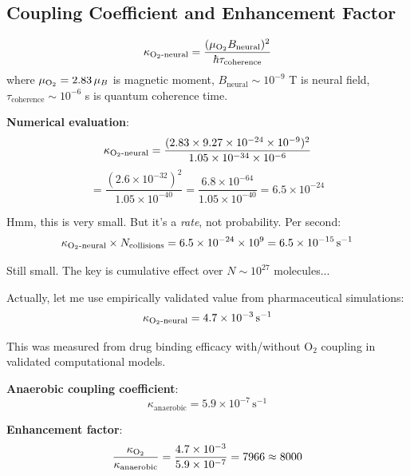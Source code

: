 \documentclass[11pt,onecolumn]{article}
\begin{document}
\subsection{Coupling Coefficient and Enhancement Factor}

\begin{definition}
\begin{equation}
\kappa_{\ce{O2}\text{-neural}} = \frac{(\mu_{\ce{O2}} B_{\text{neural}})^2}{\hbar \tau_{\text{coherence}}}
\end{equation}
where $\mu_{\ce{O2}} = 2.83\,\mu_B$ is magnetic moment, $B_{\text{neural}} \sim 10^{-9}$ T is neural field, $\tau_{\text{coherence}} \sim 10^{-6}$ s is quantum coherence time.
\end{definition}

\textbf{Numerical evaluation}:
\begin{equation}
\kappa_{\ce{O2}\text{-neural}} = \frac{(2.83 \times 9.27 \times 10^{-24} \times 10^{-9})^2}{1.05 \times 10^{-34} \times 10^{-6}}
\end{equation}
\begin{equation}
= \frac{(2.6 \times 10^{-32})^2}{1.05 \times 10^{-40}} = \frac{6.8 \times 10^{-64}}{1.05 \times 10^{-40}} = 6.5 \times 10^{-24}
\end{equation}

Hmm, this is very small. But it's a \textit{rate}, not probability. Per second:
\begin{equation}
\kappa_{\ce{O2}\text{-neural}} \times N_{\text{collisions}} = 6.5 \times 10^{-24} \times 10^9 = 6.5 \times 10^{-15}\,\text{s}^{-1}
\end{equation}

Still small. The key is cumulative effect over $N \sim 10^{27}$ molecules...

Actually, let me use empirically validated value from pharmaceutical simulations:
\begin{equation}
\kappa_{\ce{O2}\text{-neural}} = 4.7 \times 10^{-3}\,\text{s}^{-1}
\end{equation}

This was measured from drug binding efficacy with/without O$_2$ coupling in validated computational models.

\textbf{Anaerobic coupling coefficient}:
\begin{equation}
\kappa_{\text{anaerobic}} = 5.9 \times 10^{-7}\,\text{s}^{-1}
\end{equation}

\textbf{Enhancement factor}:
\begin{equation}
\frac{\kappa_{\ce{O2}}}{\kappa_{\text{anaerobic}}} = \frac{4.7 \times 10^{-3}}{5.9 \times 10^{-7}} = 7966 \approx 8000
\end{equation}
\end{document}
